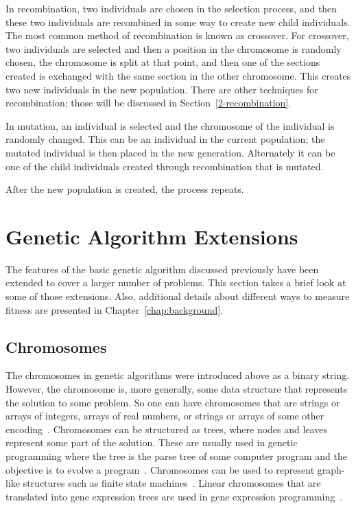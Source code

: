 In recombination, two individuals are chosen in the selection process, and then
these two individuals are recombined in some way to create new child
individuals. The most common method of recombination is known as crossover. For
crossover, two individuals are selected and then a position in the chromosome is
randomly chosen, the chromosome is split at that point, and then one of the
sections created is exchanged with the same section in the other chromosome.
This creates two new individuals in the new population. There are other
techniques for recombination; those will be discussed in
Section~\ref{2-recombination}.

In mutation, an individual is selected and the chromosome of the individual is
randomly changed. This can be an individual in the current population; the
mutated individual is then placed in the new generation. Alternately it can be
one of the child individuals created through recombination that is mutated.

After the new population is created, the process repeats.

\section{Genetic Algorithm Extensions}

The features of the basic genetic algorithm discussed previously have been
extended to cover a larger number of problems. This section takes a brief look
at some of those extensions. Also, additional details about different ways to
measure fitness are presented in Chapter~\ref{chap:background}.

\subsection{Chromosomes}

The chromosomes in genetic algorithms were introduced above as a binary string.
However, the chromosome is, more generally, some data structure that represents
the solution to some problem. So one can have chromosomes that are strings or
arrays of integers, arrays of real numbers, or strings or arrays of some other
encoding~\cite{haupt2004practical}. Chromosomes can be structured as trees,
where nodes and leaves represent some part of the solution. These are usually
used in genetic programming where the tree is the parse tree of some computer
program and the objective is to evolve a program~\cite{koza1992genetic}.
Chromosomes can be used to represent graph-like structures such as finite state
machines~\cite{fogel1999intelligence,fogel2000evolutionary}. Linear chromosomes
that are translated into gene expression trees are used in gene expression
programming~\cite{ferreira2012gene}.

